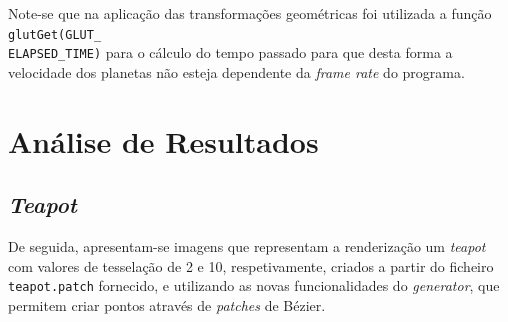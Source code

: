 \documentclass[a4paper, 11pt]{article}
\begin{document}
Note-se que na aplicação das transformações geométricas foi utilizada a função 
\texttt{glutGet(GLUT\_}\\\texttt{ELAPSED\_TIME)} para o cálculo do tempo passado para que desta 
forma a velocidade dos planetas não esteja dependente da \textit{frame rate} do programa.

\pagebreak

\section{Análise de Resultados}

\subsection{\textit{Teapot}}

De seguida, apresentam-se imagens que representam a renderização um \textit{teapot} com valores 
de tesselação de 2 e 10, respetivamente, criados a partir do ficheiro \texttt{teapot.patch} 
fornecido, e utilizando as novas funcionalidades do \textit{generator}, que permitem criar pontos 
através de \textit{patches} de Bézier.
\end{document}
